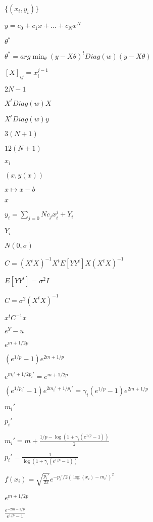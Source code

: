 \documentclass{article}
\begin{document}
{{{$\{(x_i, y_i)\}$
\pagebreak

$y = c_0 + c_1 x + ... + c_N x^N$
\pagebreak

$\theta^*$
\pagebreak

$\theta^* = arg\min_{\theta}{(y - X\theta)^tDiag(w)(y - X\theta)}$
\pagebreak

$[X]_{ij} = x_i^{j-1}$
\pagebreak

$2N-1$
\pagebreak

$X^tDiag(w)X$
\pagebreak

$X^tDiag(w)y$
\pagebreak

$3(N+1)$
\pagebreak

$12(N+1)$
\pagebreak

$x_i$
\pagebreak

$(x, y(x))$
\pagebreak

$x \mapsto x - b$
\pagebreak

$x$
\pagebreak

$y_i = \sum_{j=0}{N} c_j x_i^j + Y_i$
\pagebreak

$Y_i$
\pagebreak

$N(0, \sigma)$
\pagebreak

$C = (X^t X)^{-1}X^t E[YY^t] X (X^t X)^{-1}$
\pagebreak

$E[YY^t] = \sigma^2 I$
\pagebreak

$C = \sigma^2 (X^t X)^{-1}$
\pagebreak

$x^tC^{-1}x$
\pagebreak

$e^Y - u$
\pagebreak

$\displaystyle e^{m + 1/2p}$
\pagebreak

$\displaystyle (e^{1/p} - 1)e^{2m + 1/p}$
\pagebreak

$\displaystyle e^{m_i' + 1/2p_i'} = e^{m + 1/2p}$
\pagebreak

$\displaystyle (e^{1/p_i'} - 1)e^{2m_i' + 1/p_i'} = \gamma_i(e^{1/p} - 1)e^{2m + 1/p}$
\pagebreak

$m_i'$
\pagebreak

$p_i'$
\pagebreak

$\displaystyle m_i' = m + \frac{1/p - \log(1 + \gamma_i(e^{1/p} - 1))}{2}$
\pagebreak

$\displaystyle p_i' = \frac{1}{\log(1 + \gamma_i(e^{1/p} - 1))}$
\pagebreak

$\displaystyle f(x_i) = \sqrt{\frac{p_i'}{2\pi}}e^{-p_i'/2(\log(x_i) - m_i')^2}$
\pagebreak

$e ^{m + 1 / 2 p}$
\pagebreak

$\displaystyle \frac{e ^{-2m - 1 / p}}{e ^{1 / p} - 1}$
\pagebreak

}}}
\end{document}
